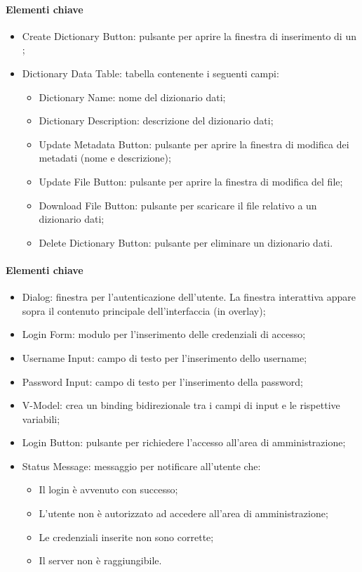 
\paragraph*{Elementi chiave}
\begin{itemize}
  \item Create Dictionary Button: pulsante per aprire la finestra di inserimento di un ;
  \item Dictionary Data Table: tabella contenente i seguenti campi:
  \begin{itemize}
    \item Dictionary Name: nome del dizionario dati;
    \item Dictionary Description: descrizione del dizionario dati;
    \item Update Metadata Button: pulsante per aprire la finestra di modifica dei metadati (nome e descrizione);
    \item Update File Button: pulsante per aprire la finestra di modifica del file;
    \item Download File Button: pulsante per scaricare il file relativo a un dizionario dati;
    \item Delete Dictionary Button: pulsante per eliminare un dizionario dati.
  \end{itemize}
\end{itemize}


\paragraph*{Elementi chiave}
\begin{itemize}
  \item Dialog: finestra per l'autenticazione dell'utente. La finestra interattiva appare sopra il contenuto principale dell'interfaccia (in overlay);
  \item Login Form: modulo per l'inserimento delle credenziali di accesso;
  \item Username Input: campo di testo per l'inserimento dello username;
  \item Password Input: campo di testo per l'inserimento della password;
  \item V-Model: crea un binding bidirezionale tra i campi di input e le rispettive variabili;
  \item Login Button: pulsante per richiedere l'accesso all'area di amministrazione;
  \item Status Message: messaggio per notificare all'utente che:
  \begin{itemize}
    \item Il login è avvenuto con successo;
    \item L'utente non è autorizzato ad accedere all'area di amministrazione;
    \item Le credenziali inserite non sono corrette;
    \item Il server non è raggiungibile.
  \end{itemize}
\end{itemize}

